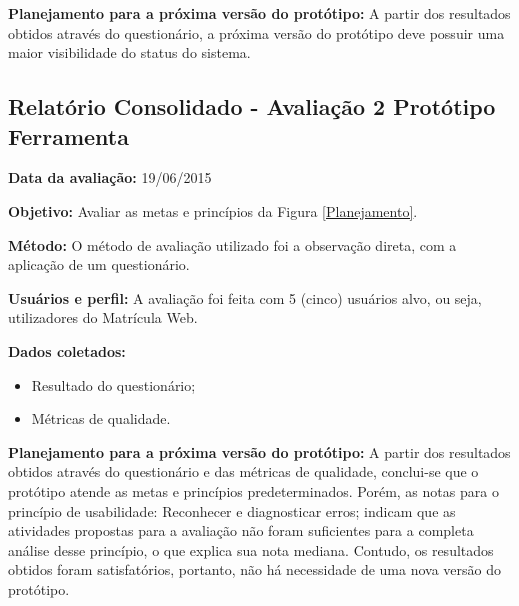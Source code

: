   \textbf{Planejamento para a próxima versão do protótipo:}
  A partir dos resultados obtidos através do questionário, a próxima versão do protótipo deve possuir uma maior visibilidade do status do sistema.

  \vfill
  \pagebreak


  \subsection{Relatório Consolidado - Avaliação 2 Protótipo Ferramenta}

  \flushleft \textbf{Data da avaliação:} 
  19/06/2015

  \textbf{Objetivo:}
  Avaliar as metas e princípios da Figura \ref{Planejamento}.

  \textbf{Método:}
  O método de avaliação utilizado foi a observação direta, com a aplicação de um questionário.

  \textbf{Usuários e perfil:}
  A avaliação foi feita com 5 (cinco) usuários alvo, ou seja, utilizadores do Matrícula Web.

  \textbf{Dados coletados:}

  \begin{itemize}
    \item Resultado do questionário;
    \item Métricas de qualidade.
  \end{itemize}

  \textbf{Planejamento para a próxima versão do protótipo:}
  A partir dos resultados obtidos através do questionário e das métricas de qualidade, conclui-se que o protótipo atende as metas
  e princípios predeterminados. Porém, as notas para o princípio de usabilidade: Reconhecer e diagnosticar erros; indicam que as atividades
  propostas para a avaliação não foram suficientes para a completa análise desse princípio, o que explica sua nota mediana. Contudo, os
  resultados obtidos foram satisfatórios, portanto, não há necessidade de uma nova versão do protótipo.

  \vfill
  \pagebreak
